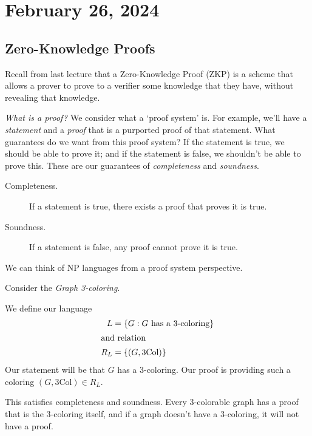 \section{February 26, 2024}
\label{20240226}

\subsection{Zero-Knowledge Proofs}
Recall from last lecture that a Zero-Knowledge Proof (ZKP) is a scheme that allows a prover to prove to a verifier some knowledge that they have, without revealing that knowledge.

\emph{What is a proof?} We consider what a `proof system' is. For example, we'll have a \emph{statement} and a \emph{proof} that is a purported proof of that statement. What guarantees do we want from this proof system? If the statement is true, we should be able to prove it; and if the statement is false, we shouldn't be able to prove this. These are our guarantees of \emph{completeness} and \emph{soundness}.
\begin{description}
    \item[Completeness.] If a statement is true, there exists a proof that proves it is true.
    \item[Soundness.] If a statement is false, any proof cannot prove it is true.
\end{description}

We can think of NP languages from a proof system perspective.

\begin{example}
    Consider the \emph{Graph 3-coloring}.


    We define our language
    \begin{align*}
        L   & = \{G: G\text{ has a 3-coloring}\} \\
        \intertext{and relation}
        R_L & = \{(G, \textrm{3Col})\}
    \end{align*}
    Our statement will be that $G$ has a 3-coloring. Our proof is providing such a coloring $(G, \mathrm{3Col})\in R_L$.

    This satisfies completeness and soundness. Every 3-colorable graph has a proof that is the 3-coloring itself, and if a graph doesn't have a 3-coloring, it will not have a proof.
\end{example}

